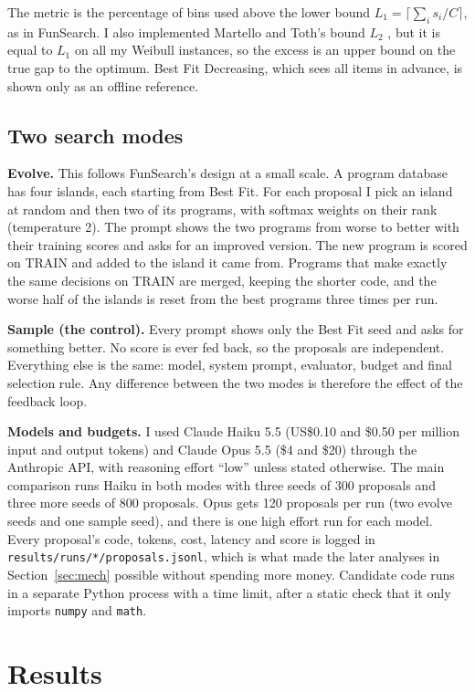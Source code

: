 \documentclass[10pt]{article}
\begin{document}
The metric is the percentage of bins used above the lower bound $L_1=\lceil\sum_i s_i/C\rceil$, as in
FunSearch. I also implemented Martello and Toth's bound $L_2$ \cite{martello1990knapsack}, but it is
equal to $L_1$ on all my Weibull instances, so the excess is an upper bound on the true gap to the
optimum. Best Fit Decreasing, which sees all items in advance, is shown only as an offline reference.

\subsection{Two search modes}
\textbf{Evolve.} This follows FunSearch's design at a small scale. A program database has four
islands, each starting from Best Fit. For each proposal I pick an island at random and then two of its
programs, with softmax weights on their rank (temperature 2). The prompt shows the two programs
from worse to better with their training scores and asks for an improved version. The new program is
scored on TRAIN and added to the island it came from. Programs that make exactly the same decisions on
TRAIN are merged, keeping the shorter code, and the worse half of the islands is reset from the best
programs three times per run.

\textbf{Sample (the control).} Every prompt shows only the Best Fit seed and asks for something
better. No score is ever fed back, so the proposals are independent. Everything else is the same:
model, system prompt, evaluator, budget and final selection rule. Any difference between the two
modes is therefore the effect of the feedback loop.

\textbf{Models and budgets.} I used Claude Haiku 5.5 (US\$0.10 and \$0.50 per million input and
output tokens) and Claude Opus 5.5 (\$4 and \$20) through the Anthropic API, with reasoning effort
``low'' unless stated otherwise. The main comparison runs Haiku in both modes with three seeds of
300 proposals and three more seeds of 800 proposals. Opus gets 120 proposals per run (two evolve
seeds and one sample seed), and there is one high effort run for each model. Every proposal's code,
tokens, cost, latency and score is logged in \texttt{results/runs/*/proposals.jsonl}, which is what
made the later analyses in Section~\ref{sec:mech} possible without spending more money. Candidate
code runs in a separate Python process with a time limit, after a static check that it only imports
\texttt{numpy} and \texttt{math}.

\section{Results}
\end{document}
